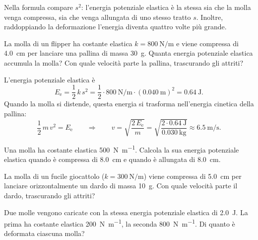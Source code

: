 \begin{remark}
Nella formula compare $s^2$: l'energia potenziale elastica è la stessa sia che la molla venga compressa, sia che venga allungata di uno stesso tratto $s$. Inoltre, raddoppiando la deformazione l'energia diventa quattro volte più grande.
\end{remark}

\begin{testexample}
La molla di un flipper ha costante elastica $k = \SI{800}{\newton\per\metre}$ e viene compressa di \SI{4,0}{\centi\metre} per lanciare una pallina di massa \SI{30}{\gram}. Quanta energia potenziale elastica accumula la molla? Con quale velocità parte la pallina, trascurando gli attriti?

L'energia potenziale elastica è
\[ E_\text{e} = \frac{1}{2}\,k\,s^2 = \frac{1}{2} \cdot \SI{800}{\newton\per\metre} \cdot (\SI{0,040}{\metre})^2 = \SI{0,64}{\joule}. \]
Quando la molla si distende, questa energia si trasforma nell'energia cinetica della pallina:
\[ \frac{1}{2}\,m\,v^2 = E_\text{e} \qquad\Longrightarrow\qquad v = \sqrt{\frac{2\,E_\text{e}}{m}} = \sqrt{\frac{2 \cdot \SI{0,64}{\joule}}{\SI{0,030}{\kilo\gram}}} \approx \SI{6,5}{\metre\per\second}. \]
\end{testexample}

\begin{esercizio}
Una molla ha costante elastica \SI{500}{\newton\per\metre}. Calcola la sua energia potenziale elastica quando è compressa di \SI{8,0}{\centi\metre} e quando è allungata di \SI{8,0}{\centi\metre}.\\
\end{esercizio}

\begin{esercizio}
La molla di un fucile giocattolo ($k = \SI{300}{\newton\per\metre}$) viene compressa di \SI{5,0}{\centi\metre} per lanciare orizzontalmente un dardo di massa \SI{10}{\gram}. Con quale velocità parte il dardo, trascurando gli attriti?\\
\end{esercizio}

\begin{esercizio}
Due molle vengono caricate con la stessa energia potenziale elastica di \SI{2,0}{\joule}. La prima ha costante elastica \SI{200}{\newton\per\metre}, la seconda \SI{800}{\newton\per\metre}. Di quanto è deformata ciascuna molla?\\
\end{esercizio}

